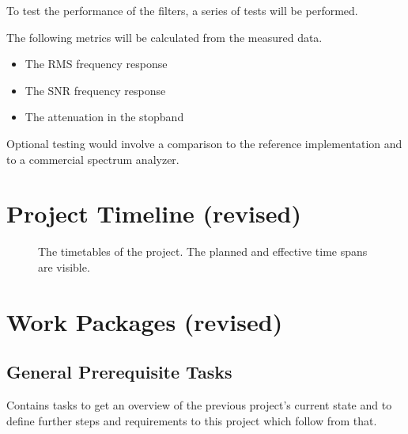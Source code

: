\documentclass[a4paper,oneside]{alpenspecs/alpenspecs}
\begin{document}
To test the performance of the filters, a series of tests will be performed.

The following metrics will be calculated from the measured data.

\begin{itemize}
    \item The RMS frequency response
    \item The SNR frequency response
    \item The attenuation in the stopband
\end{itemize}

Optional testing would involve a comparison to the reference implementation and to a commercial spectrum analyzer.

\chapter{Project Timeline (revised)} %
\label{ch:initial}

\begin{a3pages}
    \begin{figure}
        \centering
        
        \caption{The timetables of the project. The planned and effective time spans are visible.}
    \end{figure}
\end{a3pages}

\chapter{Work Packages (revised)} %
\label{ch:wpac}


\section{General Prerequisite Tasks}
\label{sec:general}

Contains tasks to get an overview  of the previous project's current state and
to define  further steps and  requirements to  this project which  follow from
that.
\end{document}
